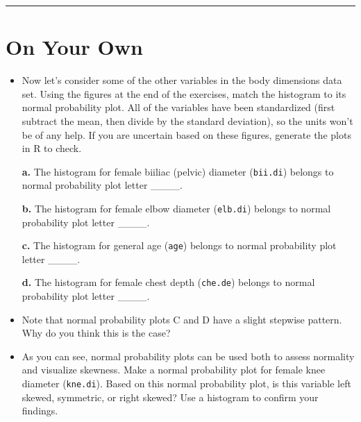 \documentclass[]{book}
\theoremstyle{definition}
\theoremstyle{definition}
\theoremstyle{remark}
\begin{document}
\begin{center}\rule{0.5\linewidth}{\linethickness}\end{center}

\section*{On Your Own}\label{on-your-own-1}

\begin{itemize}
\item
  Now let's consider some of the other variables in the body dimensions
  data set. Using the figures at the end of the exercises, match the
  histogram to its normal probability plot. All of the variables have
  been standardized (first subtract the mean, then divide by the
  standard deviation), so the units won't be of any help. If you are
  uncertain based on these figures, generate the plots in R to check.

  \textbf{a.} The histogram for female biiliac (pelvic) diameter
  (\texttt{bii.di}) belongs to normal probability plot letter \_\_\_\_.

  \textbf{b.} The histogram for female elbow diameter (\texttt{elb.di})
  belongs to normal probability plot letter \_\_\_\_.

  \textbf{c.} The histogram for general age (\texttt{age}) belongs to
  normal probability plot letter \_\_\_\_.

  \textbf{d.} The histogram for female chest depth (\texttt{che.de})
  belongs to normal probability plot letter \_\_\_\_.
\item
  Note that normal probability plots C and D have a slight stepwise
  pattern.\\
  Why do you think this is the case?
\item
  As you can see, normal probability plots can be used both to assess
  normality and visualize skewness. Make a normal probability plot for
  female knee diameter (\texttt{kne.di}). Based on this normal
  probability plot, is this variable left skewed, symmetric, or right
  skewed? Use a histogram to confirm your findings.
\end{itemize}
\end{document}
